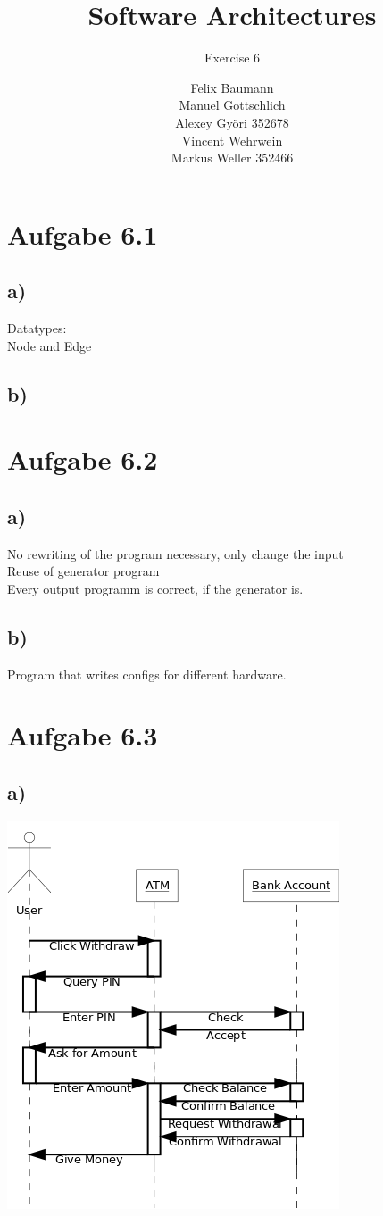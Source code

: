 \documentclass[a4paper,10pt]{scrartcl}[2003/01/01]
\title{Software Architectures}
\subtitle{Exercise 6}
\author{ Felix Baumann \\ Manuel Gottschlich \\  Alexey Gy\"ori 352678 \\ Vincent Wehrwein \\ Markus Weller 352466}
\begin{document}
    \maketitle
    
    \section*{Aufgabe 6.1}
        \subsection*{a)}
        Datatypes:\\
        Node and Edge\\
        
        \subsection*{b)}
    \section*{Aufgabe 6.2}
        \subsection*{a)}
        No rewriting of the program necessary, only change the input\\
        Reuse of generator program\\
        Every output programm is correct, if the generator is.
        \subsection*{b)}
        Program that writes configs for different hardware.
        \newpage
    \section*{Aufgabe 6.3}
        \subsection*{a)}
        \includegraphics[scale=0.5]{Diagram1}
\end{document}
